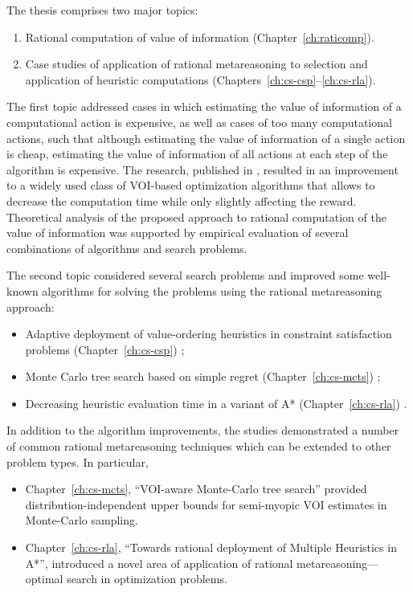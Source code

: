 The thesis comprises two major topics:
\begin {enumerate}
\item Rational computation of value of information (Chapter~\ref{ch:raticomp}).
\item Case studies of application of rational metareasoning to
  selection and application of heuristic computations (Chapters~\ref{ch:cs-csp}--\ref{ch:cs-rla}).
\end {enumerate}

The first topic addressed cases in which estimating the value
of information of a computational action is expensive, as well as
cases of too many computational actions, such that although
estimating the value of information of a single action is cheap,
estimating the value of information of all actions at each step of the
algorithm is expensive. The research, published in
\cite{TolpinShimony.raticomp}, resulted in an improvement to a widely
used class of VOI-based optimization algorithms that allows to decrease the
computation time while only slightly affecting the reward. Theoretical
analysis of the proposed approach to rational computation of the
value of information was supported by empirical evaluation of several
combinations of algorithms and search problems.

The second topic considered several search problems and improved some
well-known algorithms for solving the problems using the rational
metareasoning approach:
\begin {itemize}
\item Adaptive deployment of value-ordering heuristics in constraint
  satisfaction problems (Chapter~\ref{ch:cs-csp}) \cite{TolpinShimony.csp};
\item Monte Carlo tree search based on simple regret
  (Chapter~\ref{ch:cs-mcts}) \cite{TolpinShimony.mcts,HayRussellTolpinShimony.selecting};
\item Decreasing heuristic evaluation time in a variant of A*
  (Chapter~\ref{ch:cs-rla}) \cite{TolpinEtAl.rla}. 
\end {itemize}
In addition to the algorithm improvements, the studies demonstrated a
number of common rational metareasoning techniques which can be 
extended to other problem types. In particular,
\begin{itemize}
\item Chapter~\ref{ch:cs-mcts}, ``VOI-aware Monte-Carlo tree search''
provided distribution-independent upper bounds for semi-myopic VOI
estimates in Monte-Carlo sampling.
\item Chapter~\ref{ch:cs-rla}, ``Towards rational deployment of Multiple
Heuristics in A*'', introduced a novel area of application of rational
metareasoning---optimal search in optimization problems.
\end{itemize}

